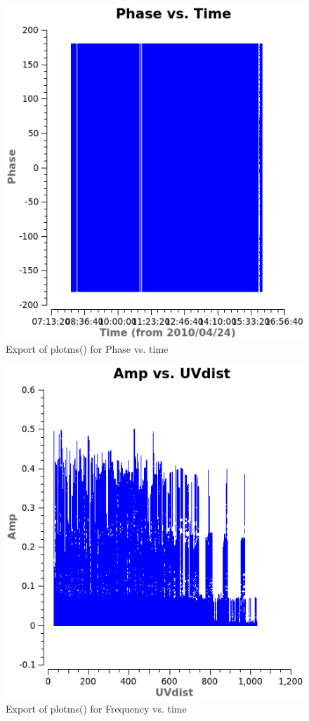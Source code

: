 \documentclass[12pt, a4paper]{article}
\begin{document}
\begin{figure}[h!]
    \centering
    \includegraphics[scale=0.65]{../Imaging/plots/phase_vs_time_vraag14-2.png}
    \caption{Export of plotms() for Phase vs. time \label{fig:14-2}}
\end{figure}


\begin{figure}[h!]
    \centering
    \includegraphics[scale=0.65]{../Imaging/plots/frequency_vs_time_vraag14-3.png}
    \caption{Export of plotms() for Frequency vs. time \label{fig:14-3}}
\end{figure}
\end{document}
